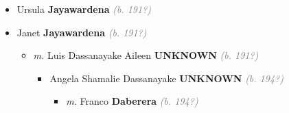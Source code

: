 \documentclass[10pt, openany]{book}
\begin{document}
\begin{itemize}
{\begin{itemize}
{\begin{itemize}
{\begin{itemize}
{\begin{itemize}
{\begin{itemize}
{  }
\item{Ionie \textbf{De Alwis} \textcolor{gray}{\textit{(b. 198?)}}
  }
\item{Devika \textbf{De Alwis} \textcolor{gray}{\textit{(b. 198?)}}
  }
\end{itemize}}
\end{itemize}
 }
\item{Damaris \textbf{Jayawardena} \textcolor{gray}{\textit{(b. 194?)}}
\begin{itemize}
\item{\textit{m.} Sena \textbf{UNKNOWN} \textcolor{gray}{\textit{(b. 194?)}}   \label{couple:00003274:00003275} \begin{itemize}
\item{Priyangani \textbf{UNKNOWN} \textcolor{gray}{\textit{(b. 198?)}}
 }
\end{itemize}}
\end{itemize}
 }
\item{Prof CHS Cleobis Hector Sirinaga \textbf{Jayawardena} \textcolor{gray}{\textit{(b. 195?)}}
     }
\item{Briarius \textbf{Jayawardena} \textcolor{gray}{\textit{(b. 195?)}}
 }
\end{itemize}}
\end{itemize}
 }
\item{Ursula \textbf{Jayawardena} \textcolor{gray}{\textit{(b. 191?)}}
 }
\item{Janet \textbf{Jayawardena} \textcolor{gray}{\textit{(b. 191?)}}
\begin{itemize}
\item{\textit{m.} Luis Dassanayake Aileen \textbf{UNKNOWN} \textcolor{gray}{\textit{(b. 191?)}}   \label{couple:00003384:00003385} \begin{itemize}
\item{Angela Shamalie Dassanayake \textbf{UNKNOWN} \textcolor{gray}{\textit{(b. 194?)}}
\begin{itemize}
\item{\textit{m.} Franco \textbf{Daberera} \textcolor{gray}{\textit{(b. 194?)}}   \label{couple:00003392:00003393} \begin{itemize}

\end{itemize}}
\end{itemize}}
\end{itemize}}
\end{itemize}}
\end{itemize}}
\end{itemize}
\end{document}
